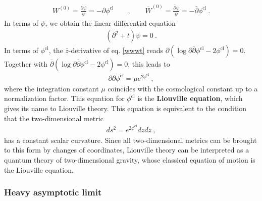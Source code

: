 \documentclass[12pt, a4paper, notitlepage, twoside]{report}
\numberwithin{equation}{section}
\theoremstyle{break}
\begin{document}
\begin{align}
 W^{(0)} = \frac{\partial\psi}{\psi} = -\partial \phi^\text{cl} \qquad , \qquad \bar W^{(0)} = \frac{\bar\partial\psi}{\psi}= -\bar\partial \phi^\text{cl}\ .
\end{align}
In terms of $\psi$, we obtain the linear differential equation
\begin{align}
 \boxed{ (\partial^2 + t ) \psi = 0 } \ .
 \label{dtp}
\end{align}
In terms of $\phi^\text{cl}$, the $\bar{z}$-derivative of eq. \eqref{wwwt} reads $\partial\left(\log \partial\bar{\partial}\phi^\text{cl} -2\phi^\text{cl}\right)=0$. Together with $\bar{\partial} \left(\log \partial\bar{\partial}\phi^\text{cl} -2\phi^\text{cl}\right)=0$, this leads to 
\begin{align}
 \partial\bar{\partial}\phi^\text{cl} = \mu e^{2\phi^\text{cl}}\ ,
\end{align}
where the integration constant $\mu$ coincides with the cosmological constant up to a normalization factor.
This equation for $\phi^\text{cl}$ is the \textbf{\boldmath Liouville equation}, which gives its name to Liouville theory.
This equation is equivalent to the condition that the two-dimensional metric
\begin{align}
 ds^2 = e^{2\phi^\text{cl}} dz d\bar{z}\ ,
\end{align}
has a constant scalar curvature.
Since all two-dimensional metrics can be brought to this form by changes of coordinates, Liouville theory can be interpreted as a quantum theory of two-dimensional gravity, whose classical equation of motion is the Liouville equation.

\subsubsection{Heavy asymptotic limit}
\end{document}
